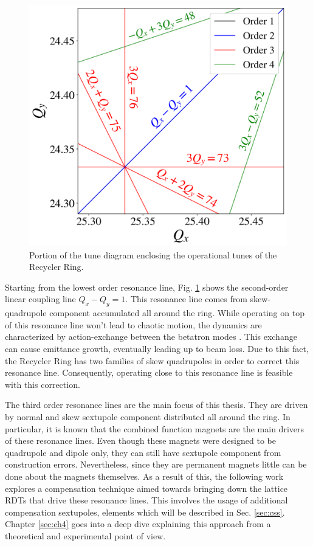 \begin{figure}[H]
   \centering
   \includegraphics[width=\columnwidth]{chapter3/rrtd.png}
   \caption{Portion of the tune diagram enclosing the operational tunes of the Recycler Ring.}
   \label{fig:rrtd}
\end{figure}

Starting from the lowest order resonance line, Fig. \ref{fig:rrtd} shows the second-order linear coupling line $Q_x-Q_y = 1$. This resonance line comes from skew-quadrupole component accumulated all around the ring. While operating on top of this resonance line won't lead to chaotic motion, the dynamics are characterized by action-exchange between the betatron modes \cite{sylee}. This exchange can cause emittance growth, eventually leading up to beam loss. Due to this fact, the Recycler Ring has two families of skew quadrupoles in order to correct this resonance line. Consequently, operating close to this resonance line is feasible with this correction.

The third order resonance lines are the main focus of this thesis. They are driven by normal and skew sextupole component distributed all around the ring. In particular, it is known that the combined function magnets are the main drivers of these resonance lines. Even though these magnets were designed to be quadrupole and dipole only, they can still have sextupole component from construction errors. Nevertheless, since they are permanent magnets little can be done about the magnets themselves. As a result of this, the following work explores a compensation technique aimed towards bringing down the lattice RDTs that drive these resonance lines. This involves the usage of additional compensation sextupoles, elements which will be described in Sec. \ref{sec:css}. Chapter \ref{sec:ch4} goes into a deep dive explaining this approach from a theoretical and experimental point of view. 

